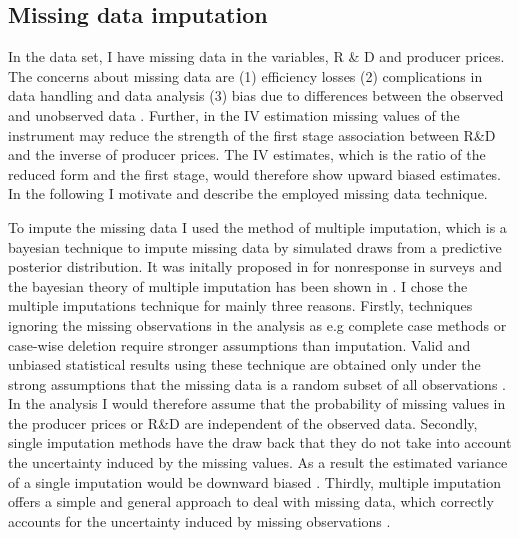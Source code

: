 \subsection{Missing data imputation}
In the data set, I have missing data in the variables, R \& D and producer prices.
The concerns about missing data are (1) efficiency losses (2) complications in data handling and data analysis (3) bias due to differences between the observed and unobserved data \parencite{schafer1998multiple}.
Further, in the IV estimation missing values of the instrument may reduce the strength of the first stage association between R\&D and the inverse of producer prices.
 The IV estimates, which is the ratio of the reduced form and the first stage, would therefore show upward biased estimates.
In the following I motivate and describe the employed missing data technique.  \par
To impute the missing data I used the method of multiple imputation, which is a bayesian technique to impute missing data by simulated draws from a predictive posterior distribution.
It was initally proposed in \textcite{rubin1978} for nonresponse in surveys and the bayesian theory of multiple imputation has been shown in \textcite{Rubin1987}.
I chose the multiple imputations technique for mainly three reasons.
Firstly, techniques  ignoring the missing observations in the analysis as e.g complete case methods or case-wise deletion require stronger assumptions than imputation.
Valid and unbiased statistical results using these technique  are obtained only under the strong assumptions that the missing data is a random subset of all observations \parencite{bhaskaran}.
In the analysis I would therefore assume that the probability of missing values in the producer prices or R\&D are independent of the observed data.
Secondly, single imputation methods have the draw back that they do not take into account the uncertainty induced by the missing values.
As a result the estimated variance of a single imputation would be downward biased \parencite{Wooldridge} .
Thirdly, multiple imputation offers a  simple and general approach to deal with missing data, which correctly accounts for the uncertainty induced by missing observations \parencite{schafer1998multiple}.
